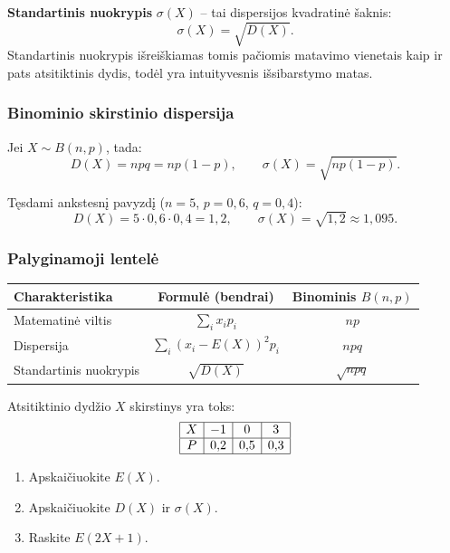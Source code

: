 \begin{definition}
\textbf{Standartinis nuokrypis} $\sigma(X)$ – tai dispersijos kvadratinė šaknis:
\[
\sigma(X) = \sqrt{D(X)}.
\]
Standartinis nuokrypis išreiškiamas tomis pačiomis matavimo vienetais kaip ir pats atsitiktinis dydis, todėl yra intuityvesnis išsibarstymo matas.
\end{definition}

\subsubsection*{Binominio skirstinio dispersija}

Jei $X \sim B(n, p)$, tada:
\[
D(X) = npq = np(1-p), \qquad \sigma(X) = \sqrt{np(1-p)}.
\]

\begin{example}
Tęsdami ankstesnį pavyzdį ($n = 5$, $p = 0{,}6$, $q = 0{,}4$):
\[
D(X) = 5 \cdot 0{,}6 \cdot 0{,}4 = 1{,}2, \qquad \sigma(X) = \sqrt{1{,}2} \approx 1{,}095.
\]
\end{example}

\subsubsection*{Palyginamoji lentelė}

\begin{center}
\begin{tabular}{|l|c|c|}
\hline
\textbf{Charakteristika} & \textbf{Formulė (bendrai)} & \textbf{Binominis $B(n,p)$} \\
\hline
Matematinė viltis & $\displaystyle\sum_{i} x_i p_i$ & $np$ \\
\hline
Dispersija & $\displaystyle\sum_{i}(x_i - E(X))^2 p_i$ & $npq$ \\
\hline
Standartinis nuokrypis & $\sqrt{D(X)}$ & $\sqrt{npq}$ \\
\hline
\end{tabular}
\end{center}

\begin{exercise}
Atsitiktinio dydžio $X$ skirstinys yra toks:
\[
\begin{array}{|c|c|c|c|}
\hline
X & -1 & 0 & 3 \\
\hline
P & 0{,}2 & 0{,}5 & 0{,}3 \\
\hline
\end{array}
\]
\begin{enumerate}[label=\alph*)]
  \item Apskaičiuokite $E(X)$.
  \item Apskaičiuokite $D(X)$ ir $\sigma(X)$.
  \item Raskite $E(2X + 1)$.
\end{enumerate}
\end{exercise}

